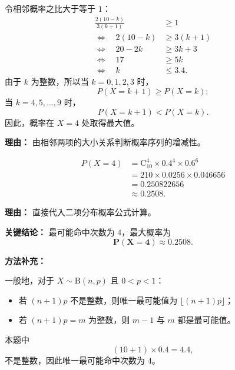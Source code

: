 \begin{examplebox}
\begin{description}[style=nextline, leftmargin=2.8em, labelsep=0.5em, itemsep=0.45em]
		\item[\textbf{第二步（判断概率增减性）：}] 令相邻概率之比大于等于 $1$：
		      \[
			      \begin{aligned}
				      \frac{2(10-k)}{3(k+1)}           & \geq 1      \\
				      \Longleftrightarrow\quad 2(10-k) & \geq 3(k+1) \\
				      \Longleftrightarrow\quad 20-2k   & \geq 3k+3   \\
				      \Longleftrightarrow\quad 17      & \geq 5k     \\
				      \Longleftrightarrow\quad k       & \leq 3.4.
			      \end{aligned}
		      \]
		      由于 $k$ 为整数，所以当 $k=0,1,2,3$ 时，
		      \[
			      P(X=k+1)\geq P(X=k);
		      \]
		      当 $k=4,5,\dots,9$ 时，
		      \[
			      P(X=k+1)<P(X=k).
		      \]
		      因此，概率在 $X=4$ 处取得最大值。
		      \par\textbf{理由：} 由相邻两项的大小关系判断概率序列的增减性。

		\item[\textbf{第三步（计算最大概率）：}]
		      \[
			      \begin{aligned}
				      P(X=4)
				       & =
				      \mathrm{C}_{10}^4 \times 0.4^4 \times 0.6^6 \\
				       & =
				      210\times 0.0256\times 0.046656             \\
				       & =
				      0.250822656                                 \\
				       & \approx 0.2508.
			      \end{aligned}
		      \]
		      \par\textbf{理由：} 直接代入二项分布概率公式计算。
	\end{description}

	\textbf{\textcolor{CExample}{关键结论：}} 最可能命中次数为 $4$，最大概率为
	\[
		\mathbf{P(X=4)\approx 0.2508}.
	\]

	\medskip
	\textbf{\textcolor{CExample}{方法补充：}}

	一般地，对于 $X\sim \mathrm{B}(n,p)$ 且 $0<p<1$：
	\begin{itemize}[leftmargin=*, itemsep=0.35em, topsep=0.3em]
		\item 若 $(n+1)p$ 不是整数，则唯一最可能值为 $\lfloor (n+1)p\rfloor$；
		\item 若 $(n+1)p=m$ 为整数，则 $m-1$ 与 $m$ 都是最可能值。
	\end{itemize}
	本题中
	\[
		(10+1)\times 0.4=4.4,
	\]
	不是整数，因此唯一最可能命中次数为 $4$。
\end{examplebox}